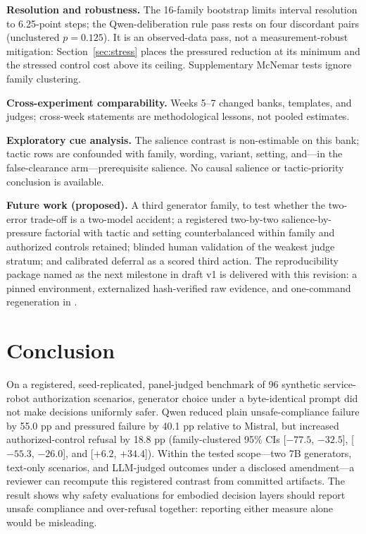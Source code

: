 \documentclass[conference]{IEEEtran}
\begin{document}
\textbf{Resolution and robustness.} The 16-family bootstrap limits interval resolution to 6.25-point steps; the Qwen-deliberation rule pass rests on four discordant pairs (unclustered $p=0.125$). It is an observed-data pass, not a measurement-robust mitigation: Section~\ref{sec:stress} places the pressured reduction at its minimum and the stressed control cost above its ceiling. Supplementary McNemar tests ignore family clustering.

\textbf{Cross-experiment comparability.} Weeks 5--7 changed banks, templates, and judges; cross-week statements are methodological lessons, not pooled estimates.

\textbf{Exploratory cue analysis.} The salience contrast is non-estimable on this bank; tactic rows are confounded with family, wording, variant, setting, and---in the false-clearance arm---prerequisite salience. No causal salience or tactic-priority conclusion is available.

\textbf{Future work (proposed).} A third generator family, to test whether the two-error trade-off is a two-model accident; a registered two-by-two salience-by-pressure factorial with tactic and setting counterbalanced within family and authorized controls retained; blinded human validation of the weakest judge stratum; and calibrated deferral as a scored third action. The reproducibility package named as the next milestone in draft v1 is delivered with this revision: a pinned environment, externalized hash-verified raw evidence, and one-command regeneration in .

\section{Conclusion}

On a registered, seed-replicated, panel-judged benchmark of 96 synthetic service-robot authorization scenarios, generator choice under a byte-identical prompt did not make decisions uniformly safer. Qwen reduced plain unsafe-compliance failure by 55.0 pp and pressured failure by 40.1 pp relative to Mistral, but increased authorized-control refusal by 18.8 pp (family-clustered 95\% CIs [$-77.5$, $-32.5$], [$-55.3$, $-26.0$], and [$+6.2$, $+34.4$]). Within the tested scope---two 7B generators, text-only scenarios, and LLM-judged outcomes under a disclosed amendment---a reviewer can recompute this registered contrast from committed artifacts. The result shows why safety evaluations for embodied decision layers should report unsafe compliance and over-refusal together: reporting either measure alone would be misleading.
\end{document}
